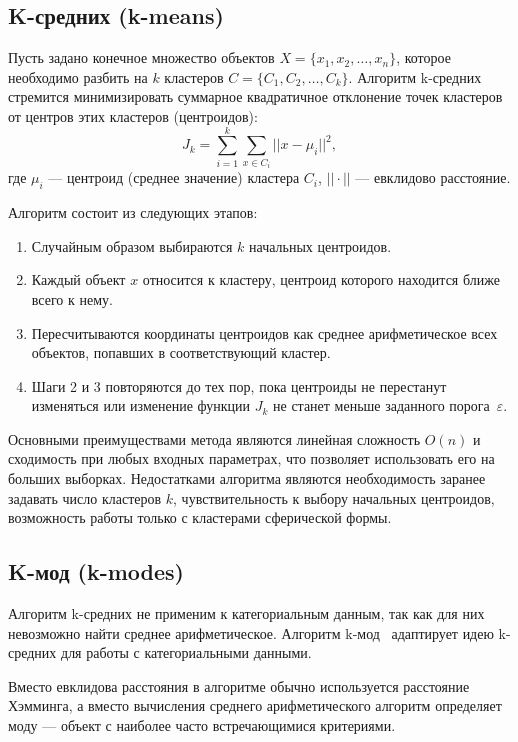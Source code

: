 \subsection{K-средних (k-means)}
Пусть задано конечное множество объектов $X = \{x_1, x_2, \dots, x_n\}$, которое необходимо разбить на $k$ кластеров $C = \{C_1, C_2, \dots, C_k\}$. Алгоритм k-средних~\cite{k_means} стремится минимизировать суммарное квадратичное отклонение точек кластеров от центров этих кластеров (центроидов):
\begin{equation}
	J_k = \sum_{i=1}^{k} \sum_{x \in C_i} ||x - \mu_i||^2,
	\label{eq::j_k}
\end{equation}
где $\mu_i$ --- центроид (среднее значение) кластера $C_i$, $||\cdot||$ --- евклидово расстояние.

Алгоритм состоит из следующих этапов:
\begin{enumerate}
	\item Случайным образом выбираются $k$ начальных центроидов.
	\item Каждый объект $x$ относится к кластеру, центроид которого находится ближе всего к нему.
	\item Пересчитываются координаты центроидов как среднее арифметическое всех объектов, попавших в соответствующий кластер.
	\item Шаги 2 и 3 повторяются до тех пор, пока центроиды не перестанут изменяться или изменение функции $J_k$ не станет меньше заданного порога~$\varepsilon$.
\end{enumerate}

Основными преимуществами метода являются линейная сложность $O(n)$ и сходимость при любых входных параметрах, что позволяет использовать его на больших выборках. Недостатками алгоритма являются необходимость заранее задавать число кластеров $k$, чувствительность к выбору начальных центроидов, возможность работы только с кластерами сферической формы.

\subsection{K-мод (k-modes)}
Алгоритм k-средних не применим к категориальным данным, так как для них невозможно найти среднее арифметическое. Алгоритм k-мод~\cite{k_modes} адаптирует идею k-средних для работы с категориальными данными.

Вместо евклидова расстояния в алгоритме обычно используется расстояние Хэмминга, а вместо вычисления среднего арифметического алгоритм определяет моду --- объект с наиболее часто встречающимися критериями. 

